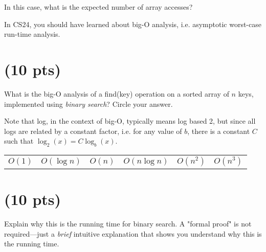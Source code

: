 \documentclass[11pt]{article}
\begin{document}
In this case, what is the expected number of array accesses?

\newpage

In CS24, you should have learned about big-O analysis, i.e. asymptotic worst-case run-time analysis.

\section{(10 pts)}
\label{sec:org26d30f8}

What is the big-O analysis of a find(key) operation on a sorted array of \(n\) keys, implemented using \emph{binary search}? Circle your answer.

Note that log, in the context of big-O, typically means log based 2, but since all logs are related by a constant factor, i.e. for any value of \(b\), there is a constant \(C\) such that \(\log_2(x) = C\log_b(x)\).


\begin{center}
\begin{tabular}{llllll}
\(O(1)\) & \(O(\log n)\) & \(O(n)\) & \(O(n \log n)\) & \(O(n^2)\) & \(O(n^3)\)\\
\end{tabular}
\end{center}

\section{(10 pts)}
\label{sec:org88ffa43}
Explain why this is the running time for binary search. A "formal proof" is not required—just a \emph{brief} intuitive explanation that shows you understand why this is the running time.
\end{document}

